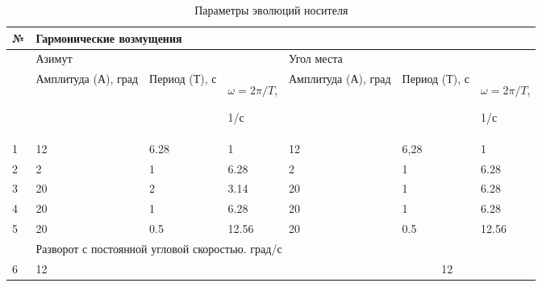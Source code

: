 \begin{table}[!h]
	\caption{Параметры эволюций носителя}%
	\label{tab:disturb}%
	\centering
	\begin{tabular}{p{0.23in}p{0.99in}p{0.82in}p{0.62in}p{0.18in}p{0.62in}p{0.16in}p{0.49in}p{0.7in}}
		\hline
		\multicolumn{1}{|p{0.23in}}{№} & 
		\multicolumn{8}{|p{5.87in}|}{Гармонические возмущения} \\
		\hline
		\multicolumn{1}{|p{0.23in}}{} & 
		\multicolumn{3}{|p{2.72in}}{Азимут} & 
		\multicolumn{5}{|p{2.95in}|}{Угол места} \\
		\hline
		\multicolumn{1}{|p{0.23in}}{} & 
		\multicolumn{1}{|p{0.99in}}{Амплитуда (А), град} & 
		\multicolumn{1}{|p{0.82in}}{Период (Т), с} & 
		\multicolumn{1}{|p{0.62in}}{$\omega=2\pi/T$, \par 1/с} & 
		\multicolumn{2}{|p{1.0in}}{Амплитуда (А), град} & 
		\multicolumn{2}{|p{0.85in}}{Период (Т), с} & 
		\multicolumn{1}{|p{0.7in}|}{$\omega=2\pi/T$, \par 1/с} \\
		\hline
		\multicolumn{1}{|p{0.23in}}{1} & 
		\multicolumn{1}{|p{0.99in}}{12} & 
		\multicolumn{1}{|p{0.82in}}{6.28} & 
		\multicolumn{1}{|p{0.62in}}{1} & 
		\multicolumn{2}{|p{1.0in}}{12} & 
		\multicolumn{2}{|p{0.85in}}{6,28} & 
		\multicolumn{1}{|p{0.7in}|}{1} \\
		\hline
		\multicolumn{1}{|p{0.23in}}{2} & 
		\multicolumn{1}{|p{0.99in}}{2} & 
		\multicolumn{1}{|p{0.82in}}{1} & 
		\multicolumn{1}{|p{0.62in}}{6.28} & 
		\multicolumn{2}{|p{1.0in}}{2} & 
		\multicolumn{2}{|p{0.85in}}{1} & 
		\multicolumn{1}{|p{0.7in}|}{6.28} \\
		\hline
		\multicolumn{1}{|p{0.23in}}{3} & 
		\multicolumn{1}{|p{0.99in}}{20} & 
		\multicolumn{1}{|p{0.82in}}{2} & 
		\multicolumn{1}{|p{0.62in}}{3.14} & 
		\multicolumn{2}{|p{1.0in}}{20} & 
		\multicolumn{2}{|p{0.85in}}{1} & 
		\multicolumn{1}{|p{0.7in}|}{6.28} \\
		\hline
		\multicolumn{1}{|p{0.23in}}{4} & 
		\multicolumn{1}{|p{0.99in}}{20} & 
		\multicolumn{1}{|p{0.82in}}{1} & 
		\multicolumn{1}{|p{0.62in}}{6.28} & 
		\multicolumn{2}{|p{1.0in}}{20} & 
		\multicolumn{2}{|p{0.85in}}{1} & 
		\multicolumn{1}{|p{0.7in}|}{6.28} \\
		\hline
		\multicolumn{1}{|p{0.23in}}{5} & 
		\multicolumn{1}{|p{0.99in}}{20} & 
		\multicolumn{1}{|p{0.82in}}{0.5} & 
		\multicolumn{1}{|p{0.62in}}{12.56} & 
		\multicolumn{2}{|p{1.0in}}{20} & 
		\multicolumn{2}{|p{0.85in}}{0.5} & 
		\multicolumn{1}{|p{0.7in}|}{12.56} \\
		\hline
		\multicolumn{1}{|p{0.23in}}{} & 
		\multicolumn{8}{|p{5.87in}|}{Разворот с постоянной угловой скоростью. град/с} \\
		\hline
		\multicolumn{1}{|p{0.23in}}{6} & 
		\multicolumn{2}{|p{2.0in}}{12} & 
		\multicolumn{2}{|p{0.91in}}{} & 
		\multicolumn{2}{|p{0.98in}}{} & 
		\multicolumn{2}{|p{1.39in}|}{12} \\
		\hline		
		
	\end{tabular}
\end{table}

